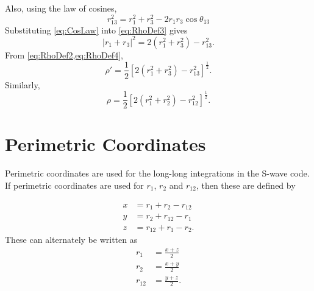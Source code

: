 \documentclass[Dissertation.tex]{subfiles}
\begin{document}
Also, using the law of cosines,
\begin{equation}
r_{13}^2 = r_1^2 + r_3^2 - 2 r_1 r_3 \cos \theta_{13}
\label{eq:CosLaw}
\end{equation}
Substituting \cref{eq:CosLaw} into \cref{eq:RhoDef3} gives
\begin{equation}
\left| r_1 + r_3 \right|^2 = 2 \left( r_1^2 + r_3^2 \right) - r_{13}^2.
\label{eq:RhoDef4}
\end{equation}
From \cref{eq:RhoDef2,eq:RhoDef4},
\begin{equation}
\label{eq:RhopRDef}
\rho' = \frac{1}{2} \left[ 2 \left(r_1^2 + r_3^2 \right) - r_{13}^2 \right] ^ \frac{1}{2}.
\end{equation}
Similarly,
\begin{equation}
\label{eq:RhoRDef}
\rho = \frac{1}{2} \left[ 2 \left(r_1^2 + r_2^2 \right) - r_{12}^2 \right] ^ \frac{1}{2}.
\end{equation}


\section{Perimetric Coordinates}
\label{sec:PerimetricCoords}

Perimetric coordinates are used for the long-long integrations in the S-wave
code. If perimetric coordinates are used for $r_1$, $r_2$ and $r_{12}$, then
these are defined by \cite{Armour1991}

\begin{align}
\label{eq:PerimetricCoords1}
\nonumber x &= r_1 + r_2 - r_{12} \\
\nonumber y &= r_2 + r_{12} - r_1 \\
z &= r_{12} + r_1 - r_2.
\end{align}
These can alternately be written as
\begin{align}
\label{eq:PerimetricCoords2}
\nonumber r_1 &= \frac{x+z}{2} \\
\nonumber r_2 &= \frac{x+y}{2} \\
r_{12} &= \frac{y+z}{2}.
\end{align}
\end{document}
